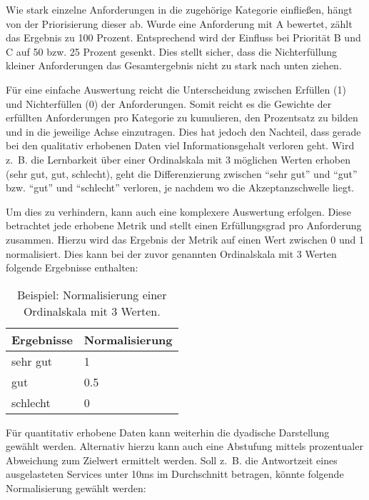 Wie stark einzelne Anforderungen in die zugehörige Kategorie einfließen, hängt von der Priorisierung dieser ab. Wurde eine Anforderung mit A bewertet, zählt das Ergebnis zu 100 Prozent. Entsprechend wird der Einfluss bei Priorität B und C auf 50 bzw. 25 Prozent gesenkt. Dies stellt sicher, dass die Nichterfüllung kleiner Anforderungen das Gesamtergebnis nicht zu stark nach unten ziehen. 

Für eine einfache Auswertung reicht die Unterscheidung zwischen Erfüllen (1) und Nichterfüllen (0) der Anforderungen. Somit reicht es die Gewichte der erfüllten Anforderungen pro Kategorie zu kumulieren, den Prozentsatz zu bilden und in die jeweilige Achse einzutragen. Dies hat jedoch den Nachteil, dass gerade bei den qualitativ erhobenen Daten viel Informationsgehalt verloren geht. Wird z.~B. die Lernbarkeit über einer Ordinalskala mit 3 möglichen Werten erhoben (sehr gut, gut, schlecht), geht die Differenzierung zwischen \enquote{sehr gut} und \enquote{gut} bzw. \enquote{gut} und \enquote{schlecht} verloren, je nachdem wo die Akzeptanzschwelle liegt.

Um dies zu verhindern, kann auch eine komplexere Auswertung erfolgen. Diese betrachtet jede erhobene Metrik und stellt einen Erfüllungsgrad pro Anforderung zusammen. Hierzu wird das Ergebnis der Metrik auf einen Wert zwischen 0 und 1 normalisiert. Dies kann bei der zuvor genannten Ordinalskala mit 3 Werten folgende Ergebnisse enthalten:
  
\begin{table}[!h]
	\centering
	\begin{tabular}{ll}
		\textbf{Ergebnisse} & \textbf{Normalisierung}\\
		\hline
		sehr gut 	& 1  	\\
		\hline
		gut			& 0.5	\\
		\hline
		schlecht	& 0  	\\
		\hline
	\end{tabular}
	\caption[Ordinalskala Normalisierung]{Beispiel: Normalisierung einer Ordinalskala mit 3 Werten.}
	\label{Ordinalskala_Normalisierung}
\end{table}

Für quantitativ erhobene Daten kann weiterhin die dyadische Darstellung gewählt werden. Alternativ hierzu kann auch eine Abstufung mittels prozentualer Abweichung zum Zielwert ermittelt werden. Soll z.~B. die Antwortzeit eines ausgelasteten Services unter 10ms im Durchschnitt betragen, könnte folgende Normalisierung gewählt werden:

